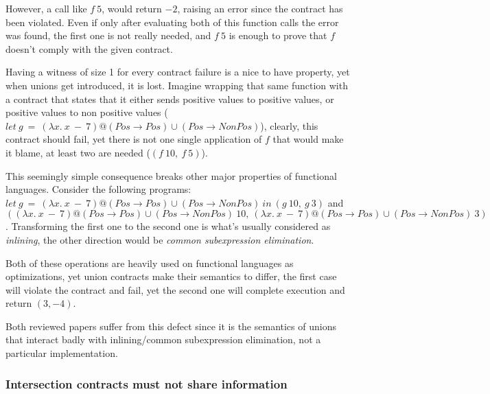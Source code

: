 However, a call like $f~5$, would return $-2$, raising an error since
the contract has been violated.
Even if only after evaluating both of this function calls
the error was found, the first one is not really needed, and $f~5$ is enough to
prove that $f$ doesn't comply with the given contract.


Having a witness of size 1 for every contract failure is a nice to have property,
yet when unions get introduced, it is lost.
Imagine wrapping that same function with a contract that states that it either
sends positive values to positive values, or positive values to non positive values
($let~g~=~(\lambda x.~x~-~7)@(Pos \rightarrow Pos) \cup (Pos \rightarrow NonPos)$),
clearly, this contract should fail, yet there is not one single application
of $f$ that would make it blame, at least two are needed ($(f~10,~f~5)$).



This seemingly simple consequence breaks other major properties
of functional languages.
Consider the following programs:
$let~g~=~(\lambda x.~x~-~7)@(Pos \rightarrow Pos) \cup (Pos \rightarrow NonPos)~in~(g~10,~g~3)$
and
$((\lambda x.~x~-~7)@(Pos \rightarrow Pos) \cup (Pos \rightarrow NonPos)~10,~(\lambda x.~x~-~7)@(Pos \rightarrow Pos) \cup (Pos \rightarrow NonPos)~3)$.
Transforming the first one to the second one is what's usually considered as \emph{inlining},
the other direction would be \emph{common subexpression elimination}.

Both of these operations are heavily used on functional languages as optimizations,
yet union contracts make their semantics to differ, the first case will violate the contract
and fail, yet the second one will complete execution and return $(3, -4)$.

Both reviewed papers suffer from this defect since it is the semantics
of unions that interact badly with inlining/common subexpression elimination,
not a particular implementation.

\subsubsection*{Intersection contracts must not share information}

